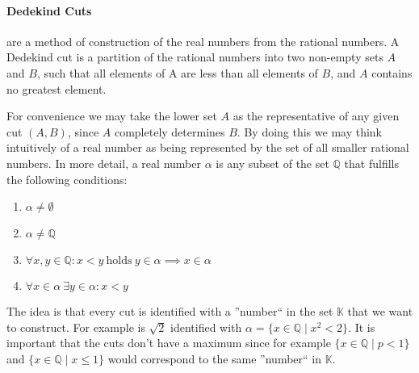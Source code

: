 \documentclass[english,titlepage]{uzhpub}
\theoremstyle{definition}
\theoremstyle{plain}
\theoremstyle{remark}
\theoremstyle{example}
\begin{document}
   \paragraph{Dedekind Cuts} are a method of construction of the real numbers from the rational numbers.
   A Dedekind cut is a partition of the rational numbers into two non-empty sets \(A\) and \(B\), such that all elements of A are less than all elements of \(B\), and \(A\) contains no greatest element.

   For convenience we may take the lower set \(A\) as the representative of any given cut \((A,B)\), since \(A\) completely determines \(B\).
   By doing this we may think intuitively of a real number as being represented by the set of all smaller rational numbers.
   In more detail, a real number \(\alpha\) is any subset of the set \(\mathbb{Q}\) that fulfills the following conditions:

   \begin{enumerate}
      \item \(\alpha \neq \emptyset\)
      \item \(\alpha \neq \mathbb{Q}\)
      \item \(\forall x, y \in \mathbb{Q}: x < y~\text{holds}~y \in \alpha \implies x \in \alpha\)
      \item \(\forall x \in \alpha~\exists y \in \alpha: x < y\)
   \end{enumerate}

   The idea is that every cut is identified with a ''number`` in the set \(\mathbb{K}\) that we want to construct.
   For example is \(\sqrt{2}\) identified with \(\alpha = \{x \in \mathbb{Q} \mid x^2 < 2\}\).
   It is important that the cuts don't have a maximum since for example \(\{x \in \mathbb{Q} \mid p < 1\}\) and \(\{x \in \mathbb{Q} \mid x \leq 1\}\) would correspond to the same ''number`` in \(\mathbb{K}\).
\end{document}

